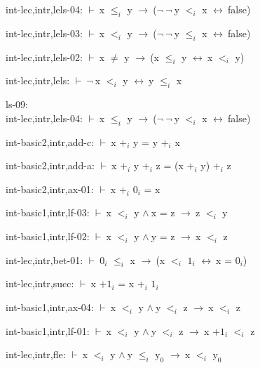 \documentclass[a4paper]{article}
\newcommand{\Fol}{\mbox{$\vdash\ $}}
\newcommand{\Not}{\mbox{$\neg\ $}}
\newcommand{\And}{\mbox{$\wedge\ $}}
\newcommand{\Imp}{\mbox{$\rightarrow\ $}}
\newcommand{\Equiv}{\mbox{$\leftrightarrow\ $}}
\begin{document}
int-lec,intr,lels-04: 
 \Fol x $\mbox{$\le$}_{i}$ y \Imp (\Not \Not y $\mbox{$<$}_{i}$ x \Equiv false)



int-lec,intr,lels-03: 
 \Fol x $\mbox{$<$}_{i}$ y \Imp (\Not \Not y $\mbox{$\le$}_{i}$ x \Equiv false)



int-lec,intr,lels-02: 
 \Fol x $\neq$ y \Imp (x $\mbox{$\le$}_{i}$ y \Equiv x $\mbox{$<$}_{i}$ y)



int-lec,intr,lels: 
 \Fol \Not x $\mbox{$<$}_{i}$ y \Equiv y $\mbox{$\le$}_{i}$ x



\bigskip

ls-09:\\ int-lec,intr,lels-04: 
 \Fol x $\mbox{$\le$}_{i}$ y \Imp (\Not \Not y $\mbox{$<$}_{i}$ x \Equiv false)



int-basic2,intr,add-c: 
 \Fol x $\mbox{+}_{i}$ y = y $\mbox{+}_{i}$ x



int-basic2,intr,add-a: 
 \Fol x $\mbox{+}_{i}$ y $\mbox{+}_{i}$ z = (x $\mbox{+}_{i}$ y) $\mbox{+}_{i}$ z



int-basic2,intr,ax-01: 
 \Fol x $\mbox{+}_{i}$ $\mbox{0}_{i}$ = x



int-basic1,intr,lf-03: 
 \Fol x $\mbox{$<$}_{i}$ y \And x = z \Imp z $\mbox{$<$}_{i}$ y



int-basic1,intr,lf-02: 
 \Fol x $\mbox{$<$}_{i}$ y \And y = z \Imp x $\mbox{$<$}_{i}$ z



int-lec,intr,bet-01: 
 \Fol $\mbox{0}_{i}$ $\mbox{$\le$}_{i}$ x \Imp (x $\mbox{$<$}_{i}$ $\mbox{1}_{i}$ \Equiv x = $\mbox{0}_{i}$)



int-lec,intr,succ: 
 \Fol x $\mbox{+1}_{i}$ = x $\mbox{+}_{i}$ $\mbox{1}_{i}$



int-basic1,intr,ax-04: 
 \Fol x $\mbox{$<$}_{i}$ y \And y $\mbox{$<$}_{i}$ z \Imp x $\mbox{$<$}_{i}$ z



int-basic1,intr,lf-01: 
 \Fol x $\mbox{$<$}_{i}$ y \And y $\mbox{$<$}_{i}$ z \Imp x $\mbox{+1}_{i}$ $\mbox{$<$}_{i}$ z



int-lec,intr,fle: 
 \Fol x $\mbox{$<$}_{i}$ y \And y $\mbox{$\le$}_{i}$ $\mbox{y}_{0}$ \Imp x $\mbox{$<$}_{i}$ $\mbox{y}_{0}$
\end{document}
